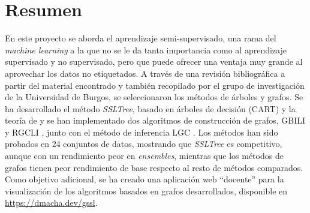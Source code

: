 \cleardoublepage

\chapter*{Resumen}
\label{resumen}

En este proyecto se aborda el aprendizaje semi-supervisado, una rama del \textit{machine learning} a la que no se le da tanta importancia como al aprendizaje supervisado y no supervisado, pero que puede ofrecer una ventaja muy grande al aprovechar los datos no etiquetados. A través de una revisión bibliográfica a partir del material encontrado y también recopilado por el grupo de investigación de la Universidad de Burgos, se seleccionaron los métodos de árboles y grafos. Se ha desarrollado el método \textit{SSLTree}, basado en árboles de decisión (CART) y la teoría de \cite{levatic2017semi} y se han implementado dos algoritmos de construcción de grafos, GBILI \cite{berton2014graph} y RGCLI \cite{berton2017rgcli}, junto con el método de inferencia LGC \cite{zhou2003learning}. Los métodos han sido probados en 24 conjuntos de datos, mostrando que \textit{SSLTree} es competitivo, aunque con un rendimiento peor en \textit{ensembles}, mientras que los métodos de grafos tienen peor rendimiento de base respecto al resto de métodos comparados. Como objetivo adicional, se ha creado una aplicación web ``docente'' para la visualización de los algoritmos basados en grafos desarrollados, disponible en \url{https://dmacha.dev/gssl}.
